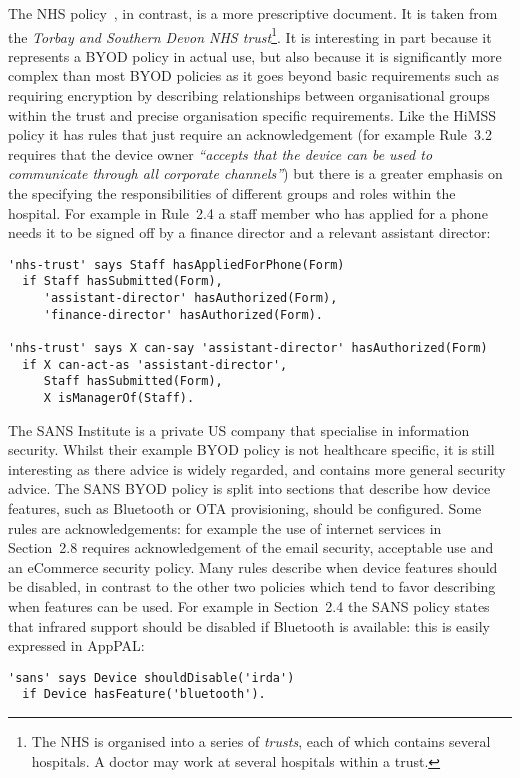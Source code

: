 \documentclass[a4paper]{article}
\begin{document}
The NHS policy~\cite{kennington_mobiles_2014}, in contrast, is a more prescriptive document.
It is taken from the \emph{Torbay and Southern Devon NHS trust}\footnote{The NHS is organised into a series of \emph{trusts}, each of which contains several hospitals.  A doctor may work at several hospitals within a trust.}. 
It is interesting in part because it represents a \ac{BYOD} policy in actual use, but also because it is significantly more complex than most \ac{BYOD} policies as it goes beyond basic requirements such as requiring encryption by describing relationships between organisational groups within the trust and precise organisation specific requirements.
Like the \ac{HiMSS} policy it has rules that just require an acknowledgement (for example Rule~3.2 requires that the device owner \emph{``accepts that the device can be used to communicate through all corporate channels''}) but there is a greater emphasis on the specifying the responsibilities of different groups and roles within the hospital.  For example in Rule~2.4 a staff member who has applied for a phone needs it to be signed off by a finance director and a relevant assistant director:
\begin{lstlisting}[title={\footnotesize\textbf{NHS}:~\itshape 
Upon receipt of the completed application form, allocation will also need to be authorised by the relevant Assistant Director and the Director of Finance.}]
'nhs-trust' says Staff hasAppliedForPhone(Form)
  if Staff hasSubmitted(Form),
     'assistant-director' hasAuthorized(Form),
     'finance-director' hasAuthorized(Form).

'nhs-trust' says X can-say 'assistant-director' hasAuthorized(Form)
  if X can-act-as 'assistant-director',
     Staff hasSubmitted(Form),
     X isManagerOf(Staff).
\end{lstlisting}

The SANS Institute is a private US company that specialise in information security.
Whilst their example \ac{BYOD} policy is not healthcare specific, it is still interesting as there advice is widely regarded, and contains more general security advice.
The SANS \ac{BYOD} policy is split into sections that describe how device features, such as Bluetooth or OTA provisioning, should be configured.  Some rules are acknowledgements: for example the use of internet services in Section~2.8 requires acknowledgement of the email security, acceptable use and an eCommerce security policy.
Many rules describe when device features should be disabled, in contrast to the other two policies which tend to favor describing when features can be used.
For example in Section~2.4 the SANS policy states that infrared support should be disabled if Bluetooth is available: this is easily expressed in AppPAL:
\begin{lstlisting}[title={\footnotesize\textbf{SANS}:~\itshape 
Infrared supported MUST be disabled if Bluetooth connectivity is supported.}]
'sans' says Device shouldDisable('irda')
  if Device hasFeature('bluetooth').
\end{lstlisting}
\end{document}

